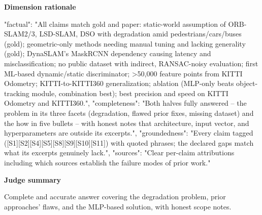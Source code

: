 \documentclass[10pt]{article}
\begin{document}
\textbf{Dimension rationale}
\begin{EvidenceText}
{
  "factual": "All claims match gold and paper: static-world assumption of ORB-SLAM2/3, LSD-SLAM, DSO with degradation amid pedestrians/cars/buses (gold); geometric-only methods needing manual tuning and lacking generality (gold); DynaSLAM's MaskRCNN dependency causing latency and misclassification; no public dataset with indirect, RANSAC-noisy evaluation; first ML-based dynamic/static discriminator; >50,000 feature points from KITTI Odometry; KITTI-to-KITTI360 generalization; ablation (MLP-only beats object-tracking module, combination best); best precision and speed on KITTI Odometry and KITTI360.",
  "completeness": "Both halves fully answered -- the problem in its three facets (degradation, flawed prior fixes, missing dataset) and the how in five bullets -- with honest notes that architecture, input vector, and hyperparameters are outside its excerpts.",
  "groundedness": "Every claim tagged ([S1][S2][S4][S5][S8][S9][S10][S11]) with quoted phrases; the declared gaps match what its excerpts genuinely lack.",
  "sources": "Clear per-claim attributions including which sources establish the failure modes of prior work."
}
\end{EvidenceText}

\textbf{Judge summary}
\begin{EvidenceText}
Complete and accurate answer covering the degradation problem, prior approaches' flaws, and the MLP-based solution, with honest scope notes.
\end{EvidenceText}
\end{document}
